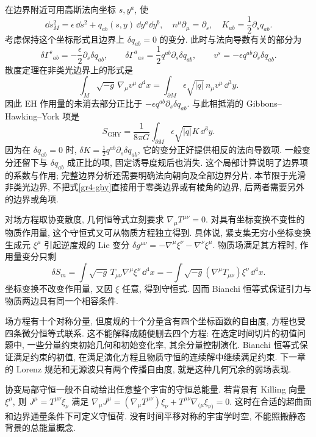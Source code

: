 在边界附近可用高斯法向坐标 $s,y^a$, 使
\[
 \dd s_M^2=\epsilon\,\dd s^2+q_{ab}(s,y)\,\dd y^a\dd y^b,
 \quad n^\mu\partial_\mu=\partial_s,\quad K_{ab}=\frac12\partial_s q_{ab}.
\]
考虑保持这个坐标形式且边界上 $\delta q_{ab}=0$ 的变分. 此时与法向导数有关的部分为
\[
 \delta\Gamma^s{}_{ab}=-\frac\epsilon2\partial_s\delta q_{ab},\qquad
 \delta\Gamma^a{}_{as}=\frac12q^{ab}\partial_s\delta q_{ab},\qquad
 v^s=-\epsilon q^{ab}\partial_s\delta q_{ab}.
\]
散度定理在非类光边界上的形式是
\[
 \int_M\sqrt{-g}\,\nabla_\mu v^\mu\,\dd^4x
  =\int_{\partial M}\epsilon\sqrt{|q|}\,n_\mu v^\mu\,\dd^3y.
\]
因此 EH 作用量的未消去部分正比于 $-\epsilon q^{ab}\partial_s\delta q_{ab}$. 与此相抵消的 Gibbons--Hawking--York 项是
\begin{equation}\label{gr4-ghy}
 S_{\mathrm{GHY}}=\frac1{8\pi G}\int_{\partial M}
                   \epsilon\sqrt{|q|}K\,\dd^3y.
\end{equation}
因为在 $\delta q_{ab}=0$ 时, $\delta K=\tfrac12q^{ab}\partial_s\delta q_{ab}$, 它的变分正好提供相反的法向导数项. 一般变分还留下与 $\delta q_{ab}$ 成正比的项, 固定诱导度规后也消失. 这个局部计算说明了边界项的系数与作用; 完整边界分析还需要明确法向朝向及全部边界分片. 本节限于光滑非类光边界, 不把式\eqref{gr4-ghy}直接用于零类边界或有棱角的边界, 后两者需要另外的边界或角项.


对场方程取协变散度, 几何恒等式立刻要求 $\nabla_\mu T^{\mu\nu}=0$. 对具有坐标变换不变性的物质作用量, 这个守恒式又可从物质方程独立得到. 具体说, 紧支集无穷小坐标变换生成元 $\xi^\mu$ 引起逆度规的 Lie 变分 $\delta g^{\mu\nu}=-\nabla^\mu\xi^\nu-\nabla^\nu\xi^\mu$. 物质场满足其方程时, 作用量变分只剩
\[
 \delta S_m=\int\sqrt{-g}\,T_{\mu\nu}\nabla^\mu\xi^\nu\,\dd^4x
 =-\int\sqrt{-g}(\nabla^\mu T_{\mu\nu})\xi^\nu\,\dd^4x.
\]
坐标变换不改变作用量, 又因 $\xi$ 任意, 得到守恒式. 因而 Bianchi 恒等式保证引力与物质两边具有同一个相容条件.

场方程有十个对称分量, 但度规的十个分量含有四个坐标函数的自由度, 方程也受四条微分恒等式联系. 这不能解释成随便删去四个方程: 在选定时间切片的初值问题中, 一些分量约束初始几何和初始变化率, 其余分量控制演化. Bianchi 恒等式保证满足约束的初值, 在满足演化方程且物质守恒的连续解中继续满足约束. 下一章的 Lorenz 规范和无源波只有两个传播自由度, 就是这种几何冗余的弱场表现.

\begin{remark}
协变局部守恒一般不自动给出任意整个宇宙的守恒总能量. 若背景有 Killing 向量 $\xi^\mu$, 则 $J^\mu=T^{\mu\nu}\xi_\nu$ 满足
$\nabla_\mu J^\mu=(\nabla_\mu T^{\mu\nu})\xi_\nu+T^{\mu\nu}\nabla_{(\mu}\xi_{\nu)}=0$.
这时在合适的超曲面和边界通量条件下可定义守恒荷. 没有时间平移对称的宇宙学时空, 不能照搬静态背景的总能量概念.
\end{remark}

